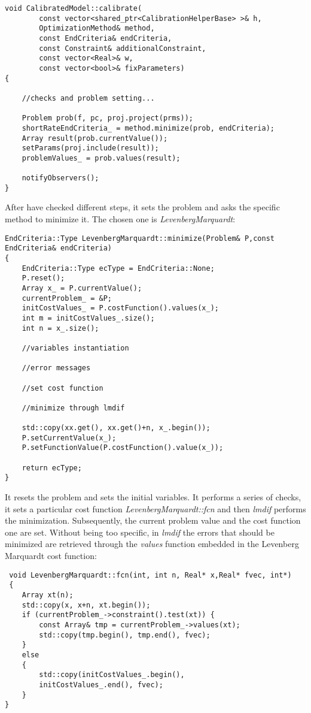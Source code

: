 \begin{lstlisting}
void CalibratedModel::calibrate(
        const vector<shared_ptr<CalibrationHelperBase> >& h,
        OptimizationMethod& method,
        const EndCriteria& endCriteria,
        const Constraint& additionalConstraint,
        const vector<Real>& w,
        const vector<bool>& fixParameters) 
{

    //checks and problem setting...
    
    Problem prob(f, pc, proj.project(prms));
    shortRateEndCriteria_ = method.minimize(prob, endCriteria);
    Array result(prob.currentValue());
    setParams(proj.include(result));
    problemValues_ = prob.values(result);

    notifyObservers();
}
\end{lstlisting}

After have checked different steps, it sets the problem and asks the specific method to minimize it. The chosen one is \textit{LevenbergMarquardt}:

\begin{lstlisting}
EndCriteria::Type LevenbergMarquardt::minimize(Problem& P,const EndCriteria& endCriteria) 
{
    EndCriteria::Type ecType = EndCriteria::None;
    P.reset();
    Array x_ = P.currentValue();
    currentProblem_ = &P;
    initCostValues_ = P.costFunction().values(x_);
    int m = initCostValues_.size();
    int n = x_.size();
        
    //variables instantiation
        
    //error messages

    //set cost function
        
    //minimize through lmdif 
        
    std::copy(xx.get(), xx.get()+n, x_.begin());
    P.setCurrentValue(x_);
    P.setFunctionValue(P.costFunction().value(x_));

    return ecType;
}
\end{lstlisting}

It resets the problem and sets the initial variables. It performs a series of checks, it sets a particular cost function \textit{LevenbergMarquardt::fcn} and then \textit{lmdif} performs the minimization. Subsequently, the current problem value and the cost function one are set. 
Without being too specific, in \textit{lmdif} the errors that should be minimized are retrieved through the \textit{values} function embedded in the Levenberg Marquardt cost function:

\begin{lstlisting}
 void LevenbergMarquardt::fcn(int, int n, Real* x,Real* fvec, int*) 
 {
    Array xt(n);
    std::copy(x, x+n, xt.begin());
    if (currentProblem_->constraint().test(xt)) {
        const Array& tmp = currentProblem_->values(xt);
        std::copy(tmp.begin(), tmp.end(), fvec);
    } 
    else
    {
        std::copy(initCostValues_.begin(),
        initCostValues_.end(), fvec);
    }
}
\end{lstlisting}

